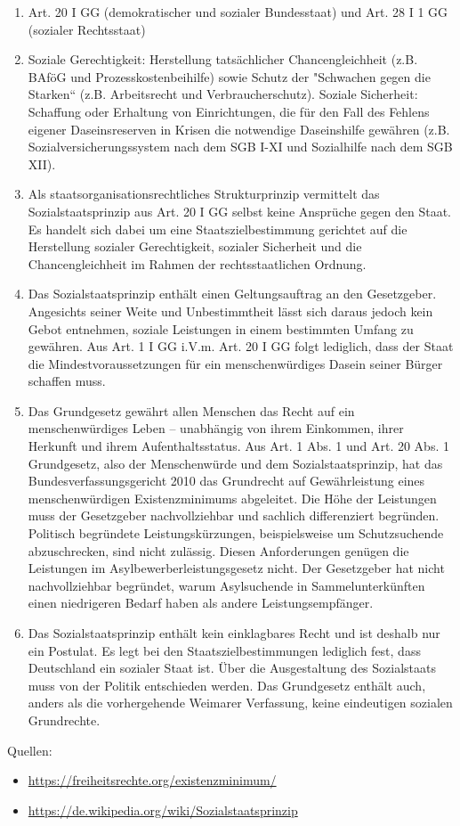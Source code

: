 \documentclass{article}
\begin{document}
	\begin{enumerate}[label=(\alph*)]
		\item Art. 20 I GG (demokratischer und sozialer Bundesstaat) und Art. 28 I 1 GG (sozialer Rechtsstaat)
		\item Soziale Gerechtigkeit: Herstellung tatsächlicher Chancengleichheit (z.B. BAföG und Prozesskostenbeihilfe) sowie Schutz der "Schwachen gegen die Starken“ (z.B. Arbeitsrecht und Verbraucherschutz). Soziale Sicherheit: Schaffung oder Erhaltung von Einrichtungen, die für den Fall des Fehlens eigener Daseinsreserven in Krisen die notwendige Daseinshilfe gewähren (z.B. Sozialversicherungssystem nach dem SGB I-XI und Sozialhilfe nach dem SGB XII).
		\item Als staatsorganisationsrechtliches Strukturprinzip vermittelt das Sozialstaatsprinzip aus Art. 20 I GG selbst keine Ansprüche gegen den Staat. Es handelt sich dabei um eine Staatszielbestimmung gerichtet auf die Herstellung sozialer Gerechtigkeit, sozialer Sicherheit und die Chancengleichheit im Rahmen der rechtsstaatlichen Ordnung.
		\item Das Sozialstaatsprinzip enthält einen Geltungsauftrag an den Gesetzgeber. Angesichts seiner Weite und Unbestimmtheit lässt sich daraus jedoch kein Gebot entnehmen, soziale Leistungen in einem bestimmten Umfang zu gewähren. Aus Art. 1 I GG i.V.m. Art. 20 I GG folgt lediglich, dass der Staat die Mindestvoraussetzungen für ein menschenwürdiges Dasein seiner Bürger schaffen muss.
		\item Das Grundgesetz gewährt allen Menschen das Recht auf ein menschenwürdiges Leben – unabhängig von ihrem Einkommen, ihrer Herkunft und ihrem Aufenthaltsstatus. Aus Art. 1 Abs. 1 und Art. 20 Abs. 1 Grundgesetz, also der Menschenwürde und dem Sozialstaatsprinzip, hat das Bundesverfassungsgericht 2010 das Grundrecht auf Gewährleistung eines menschenwürdigen Existenzminimums abgeleitet. Die Höhe der Leistungen muss der Gesetzgeber nachvollziehbar und sachlich differenziert begründen. Politisch begründete Leistungskürzungen, beispielsweise um Schutzsuchende abzuschrecken, sind nicht zulässig. Diesen Anforderungen genügen die Leistungen im Asylbewerberleistungsgesetz nicht. Der Gesetzgeber hat nicht nachvollziehbar begründet, warum Asylsuchende in Sammelunterkünften einen niedrigeren Bedarf haben als andere Leistungsempfänger.
		\item Das Sozialstaatsprinzip enthält kein einklagbares Recht und ist deshalb nur ein Postulat. Es legt bei den Staatszielbestimmungen lediglich fest, dass Deutschland ein sozialer Staat ist. Über die Ausgestaltung des Sozialstaats muss von der Politik entschieden werden. Das Grundgesetz enthält auch, anders als die vorhergehende Weimarer Verfassung, keine eindeutigen sozialen Grundrechte.
	\end{enumerate}

	Quellen:
	\begin{itemize}
		\item \url{https://freiheitsrechte.org/existenzminimum/}
		\item \url{https://de.wikipedia.org/wiki/Sozialstaatsprinzip}
	\end{itemize}
	
\end{document}
